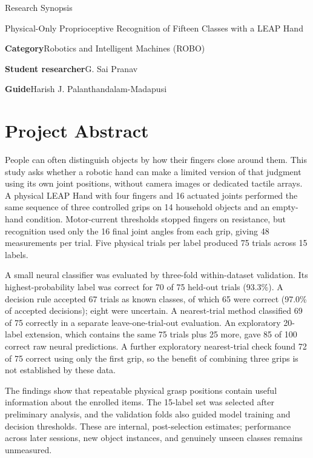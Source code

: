 \documentclass[11pt,a4paper]{article}
\begin{document}
{\LARGE Research Synopsis\par}
\vspace{7pt}
{\large Physical-Only Proprioceptive Recognition of Fifteen Classes with a LEAP Hand\par}
\vspace{12pt}
\noindent\textbf{Category}\quad Robotics and Intelligent Machines (ROBO)\par
\noindent\textbf{Student researcher}\quad G. Sai Pranav\par
\noindent\textbf{Guide}\quad Harish J. Palanthandalam-Madapusi\par

\section*{Project Abstract}

People can often distinguish objects by how their fingers close around them. This study asks whether a robotic hand can make a limited version of that judgment using its own joint positions, without camera images or dedicated tactile arrays. A physical LEAP Hand with four fingers and 16 actuated joints performed the same sequence of three controlled grips on 14 household objects and an empty-hand condition. Motor-current thresholds stopped fingers on resistance, but recognition used only the 16 final joint angles from each grip, giving 48 measurements per trial. Five physical trials per label produced 75 trials across 15 labels.

A small neural classifier was evaluated by three-fold within-dataset validation. Its highest-probability label was correct for 70 of 75 held-out trials (93.3\%). A decision rule accepted 67 trials as known classes, of which 65 were correct (97.0\% of accepted decisions); eight were uncertain. A nearest-trial method classified 69 of 75 correctly in a separate leave-one-trial-out evaluation. An exploratory 20-label extension, which contains the same 75 trials plus 25 more, gave 85 of 100 correct raw neural predictions. A further exploratory nearest-trial check found 72 of 75 correct using only the first grip, so the benefit of combining three grips is not established by these data.

The findings show that repeatable physical grasp positions contain useful information about the enrolled items. The 15-label set was selected after preliminary analysis, and the validation folds also guided model training and decision thresholds. These are internal, post-selection estimates; performance across later sessions, new object instances, and genuinely unseen classes remains unmeasured.
\end{document}
